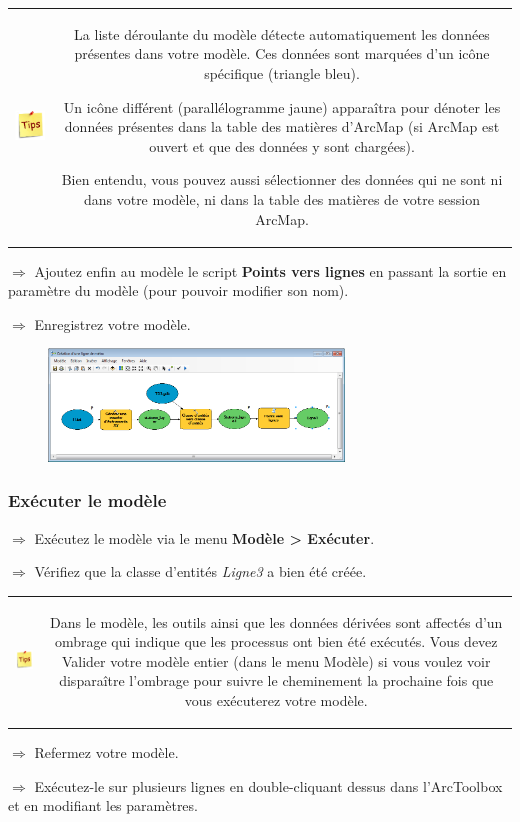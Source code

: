 \documentclass[11pt]{article}
\newcommand{\action}{$\Rightarrow$ }
\newenvironment{note}{%
	\begin{tabular}[t t]{c c}
		\includegraphics{img/tips.png}
		 &
		\begin{minipage}[c]{0.9\linewidth}
			\begin{sffamily}
}{%
			\end{sffamily}
		\end{minipage}
	\end{tabular}
}
\begin{document}
\begin{note}
La liste déroulante du modèle détecte automatiquement les données présentes dans votre modèle. Ces données sont marquées d'un icône spécifique (triangle bleu).

Un icône différent (parallélogramme jaune) apparaîtra pour dénoter les données présentes dans la table des matières d'ArcMap (si ArcMap est ouvert et que des données y sont chargées).

Bien entendu, vous pouvez aussi sélectionner des données qui ne sont ni dans votre modèle, ni dans la table des matières de votre session ArcMap.
\end{note}

\action Ajoutez enfin au modèle le script \textbf{Points vers lignes} en passant la sortie en paramètre du modèle (pour pouvoir modifier son nom).

\action Enregistrez votre modèle.
\begin{figure}[H]
	\center \includegraphics[width=0.7\textwidth]{img/td3/modelbuilder_creation-5.png}\\
\end{figure}

\subsubsection{Exécuter le modèle}
\action Exécutez le modèle via le menu \textbf{Modèle > Exécuter}.

\action Vérifiez que la classe d'entités \textit{Ligne3} a bien été créée.

\begin{note}
Dans le modèle, les outils ainsi que les données dérivées sont affectés d'un ombrage qui indique que les processus ont bien été exécutés. Vous devez Valider votre modèle entier (dans le menu Modèle) si vous voulez voir disparaître l'ombrage pour suivre le cheminement la prochaine fois que vous exécuterez votre modèle.
\end{note}

\action Refermez votre modèle.

\action Exécutez-le sur plusieurs lignes en double-cliquant dessus dans l'ArcToolbox et en modifiant les paramètres.
\end{document}
